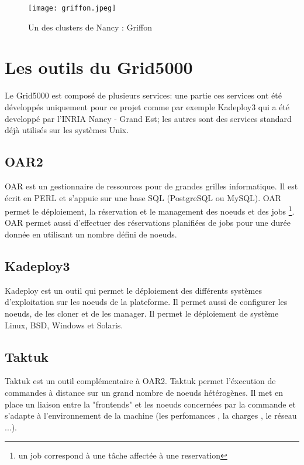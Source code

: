 \documentclass [10pt,a4paper]{report}
\begin{document}
\begin{figure}[!h]
		\centering
   		\texttt{[image: griffon.jpeg]}
   		\caption{Un des clusters de Nancy : Griffon}
    	\label{fig:griffon}
	\end{figure}
	
	\chapter{Les outils du Grid5000}
		Le Grid5000 est composé de plusieurs services: une partie ces services ont été développés uniquement pour ce projet comme par exemple Kadeploy3 qui a été developpé par l'INRIA Nancy - Grand Est; les autres sont des services standard déjà utilisés sur les systèmes Unix.  
		\section{OAR2}			
			OAR est un gestionnaire de ressources pour de grandes grilles informatique. Il est écrit en PERL et s'appuie sur une base SQL (PostgreSQL ou MySQL). OAR permet le déploiement, la réservation  et le management des noeuds et des jobs \footnote{un job correspond à une t\^ache affectée à une reservation}. OAR permet aussi d'effectuer des réservations planifiées de jobs pour une durée donnée en utilisant un nombre défini de noeuds. \\
			
		\section{Kadeploy3}
			Kadeploy est un outil qui permet le déploiement des différents systèmes d'exploitation sur les noeuds de la plateforme. Il permet aussi de configurer les noeuds, de les cloner et de les manager. Il permet le déploiement de système Linux, BSD, Windows et Solaris.
		\section{Taktuk}
			Taktuk est un outil complémentaire à OAR2. Taktuk permet l'éxecution de commandes à distance sur un grand nombre de noeuds hétérogènes. Il met en place un liaison entre la "frontends" et les noeuds concernées par la commande et s'adapte  à l'environnement de la machine (les perfomances , la charges , le réseau ...).  
\end{document}
